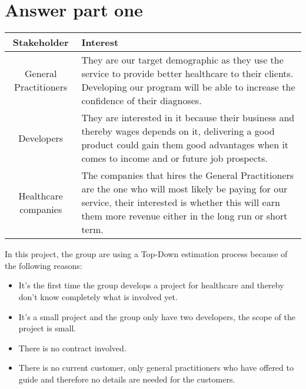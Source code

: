 \section{Answer part one}
\begin{center}
	\begin{tabular}[h]{|c|p{25em}|}
		\hline
		Stakeholder & Interest \\ \hline
		General Practitioners & They are our target demographic as they use the service to provide better healthcare to their clients. Developing our program will be able to increase the confidence of their diagnoses. \\ \hline
		Developers & They are interested in it because their business and thereby wages depends on it, delivering a good product could gain them good advantages when it comes to income and or future job prospects. \\ \hline
		Healthcare companies & The companies that hires the General Practitioners are the one who will most likely be paying for our service, their interested is whether this will earn them more revenue either in the long run or short term.\\ \hline
	\end{tabular}
\end{center}

In this project, the group are using a Top-Down estimation process because of the following reasons:
\begin{itemize}
	\item It's the first time the group develops a project for healthcare and thereby don't know completely what is involved yet.
	\item It's a small project and the group only have two developers, the scope of the project is small.
	\item There is no contract involved.
	\item There is no current customer, only general practitioners who have offered to guide and therefore no details are needed for the customers.
\end{itemize}

